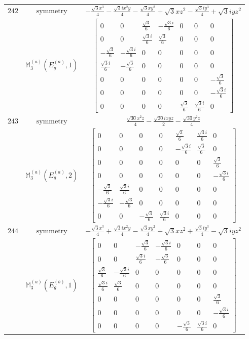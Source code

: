\documentclass[fleqn,8pt,landscape]{jsarticle}
\begin{document}
\begin{longtable}{ccc}
$ 242 $ & $ \text{symmetry} $ & $ - \frac{\sqrt{3} x^{3}}{4} - \frac{\sqrt{3} i x^{2} y}{4} - \frac{\sqrt{3} x y^{2}}{4} + \sqrt{3} x z^{2} - \frac{\sqrt{3} i y^{3}}{4} + \sqrt{3} i y z^{2} $ \\
$  $ & $ \mathbb{M}_{3}^{(a)}(E_{g}^{(a)},1) $ & $ \begin{bmatrix} 0 & 0 & \frac{\sqrt{3}}{6} & - \frac{\sqrt{3} i}{6} & 0 & 0 & 0 \\ 0 & 0 & \frac{\sqrt{3} i}{6} & \frac{\sqrt{3}}{6} & 0 & 0 & 0 \\ - \frac{\sqrt{3}}{6} & - \frac{\sqrt{3} i}{6} & 0 & 0 & 0 & 0 & 0 \\ \frac{\sqrt{3} i}{6} & - \frac{\sqrt{3}}{6} & 0 & 0 & 0 & 0 & 0 \\ 0 & 0 & 0 & 0 & 0 & 0 & - \frac{\sqrt{3}}{6} \\ 0 & 0 & 0 & 0 & 0 & 0 & - \frac{\sqrt{3} i}{6} \\ 0 & 0 & 0 & 0 & \frac{\sqrt{3}}{6} & \frac{\sqrt{3} i}{6} & 0 \end{bmatrix} $ \\ \hline
$ 243 $ & $ \text{symmetry} $ & $ \frac{\sqrt{30} x^{2} z}{4} - \frac{\sqrt{30} i x y z}{2} - \frac{\sqrt{30} y^{2} z}{4} $ \\
$  $ & $ \mathbb{M}_{3}^{(a)}(E_{g}^{(a)},2) $ & $ \begin{bmatrix} 0 & 0 & 0 & 0 & \frac{\sqrt{3}}{6} & \frac{\sqrt{3} i}{6} & 0 \\ 0 & 0 & 0 & 0 & - \frac{\sqrt{3} i}{6} & \frac{\sqrt{3}}{6} & 0 \\ 0 & 0 & 0 & 0 & 0 & 0 & \frac{\sqrt{3}}{6} \\ 0 & 0 & 0 & 0 & 0 & 0 & - \frac{\sqrt{3} i}{6} \\ - \frac{\sqrt{3}}{6} & \frac{\sqrt{3} i}{6} & 0 & 0 & 0 & 0 & 0 \\ - \frac{\sqrt{3} i}{6} & - \frac{\sqrt{3}}{6} & 0 & 0 & 0 & 0 & 0 \\ 0 & 0 & - \frac{\sqrt{3}}{6} & \frac{\sqrt{3} i}{6} & 0 & 0 & 0 \end{bmatrix} $ \\ \hline
$ 244 $ & $ \text{symmetry} $ & $ - \frac{\sqrt{3} x^{3}}{4} + \frac{\sqrt{3} i x^{2} y}{4} - \frac{\sqrt{3} x y^{2}}{4} + \sqrt{3} x z^{2} + \frac{\sqrt{3} i y^{3}}{4} - \sqrt{3} i y z^{2} $ \\
$  $ & $ \mathbb{M}_{3}^{(a)}(E_{g}^{(b)},1) $ & $ \begin{bmatrix} 0 & 0 & - \frac{\sqrt{3}}{6} & - \frac{\sqrt{3} i}{6} & 0 & 0 & 0 \\ 0 & 0 & \frac{\sqrt{3} i}{6} & - \frac{\sqrt{3}}{6} & 0 & 0 & 0 \\ \frac{\sqrt{3}}{6} & - \frac{\sqrt{3} i}{6} & 0 & 0 & 0 & 0 & 0 \\ \frac{\sqrt{3} i}{6} & \frac{\sqrt{3}}{6} & 0 & 0 & 0 & 0 & 0 \\ 0 & 0 & 0 & 0 & 0 & 0 & \frac{\sqrt{3}}{6} \\ 0 & 0 & 0 & 0 & 0 & 0 & - \frac{\sqrt{3} i}{6} \\ 0 & 0 & 0 & 0 & - \frac{\sqrt{3}}{6} & \frac{\sqrt{3} i}{6} & 0 \end{bmatrix} $ \\ \hline

\end{longtable}
\end{document}
